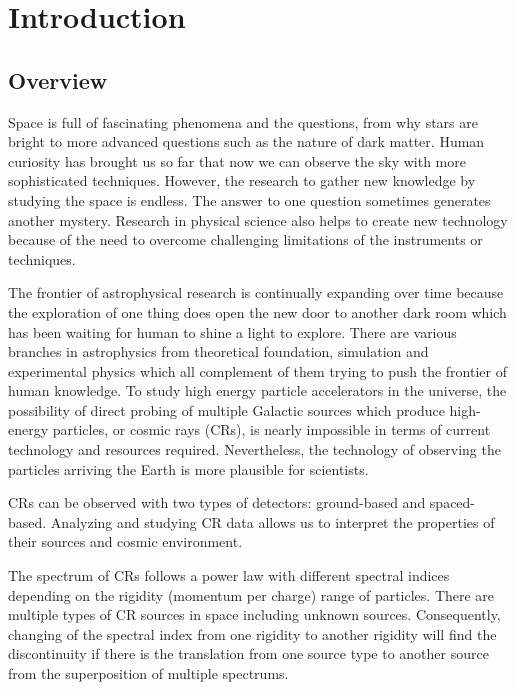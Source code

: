 \chapter{Introduction}


\section{Overview}
Space is full of fascinating phenomena and the questions,
from why stars are bright to
more advanced questions such as the nature of dark matter.
Human curiosity has brought us so far that now we
can observe the sky with more sophisticated techniques.
However, the research to gather new knowledge by studying
the space is endless. The answer to one question sometimes
generates another mystery. Research in physical science
also helps to create new technology because of the need
to overcome challenging limitations of the instruments or techniques.

The frontier of astrophysical research is continually expanding over time
because the exploration of one thing does open the new door 
to another dark room which has been waiting for human to shine a light to explore.
There are various branches in astrophysics from theoretical
foundation, simulation and experimental physics
which all complement of them trying to push the frontier of human knowledge.
To study high energy particle accelerators in the universe, the 
possibility of direct probing of multiple Galactic sources which
produce high-energy particles, or cosmic rays (CRs), is nearly
impossible in terms of current technology and resources required.
Nevertheless, the technology of observing the 
particles arriving the Earth is more plausible for scientists.


CRs can be observed with two types of detectors: ground-based
and spaced-based.  Analyzing and studying CR data allows
us to interpret the properties of their sources and cosmic environment.

The spectrum of CRs follows a power law with different spectral
indices depending on the rigidity (momentum per charge) range of
particles. There are multiple types of CR sources in space
including unknown sources.
Consequently, changing of 
the spectral index from one rigidity to another rigidity will find
the discontinuity if there is the translation from one source type 
to another source from the superposition of multiple spectrums.


